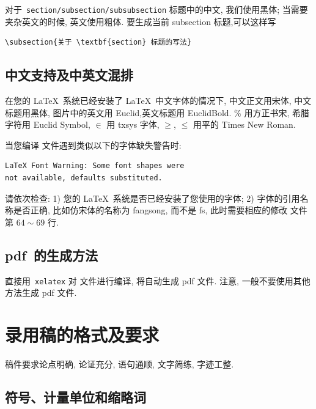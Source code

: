\documentclass{aas}
\begin{document}
对于~\verb|section/subsection/subsubsection| 标题中的中文, 我们使用黑体; 当需要夹杂英文的时候, 英文使用粗体. 要生成当前 subsection 标题,可以这样写
\begin{verbatim}
\subsection{关于 \textbf{section} 标题的写法}
\end{verbatim}

\subsection{中文支持及中英文混排}

在您的 \LaTeX\ 系统已经安装了 \LaTeX\ 中文字体的情况下, 中文正文用宋体, 中文标题用黑体,
图片中的英文用 Euclid,英文标题用 EuclidBold. \% 用方正书宋, 希腊字符用 Euclid Symbol,
$\in$ 用 txsys 字体, $\ge$, $\le$ 用平的 Times New Roman.


当您编译  文件遇到类似以下的字体缺失警告时:
\begin{verbatim}
LaTeX Font Warning: Some font shapes were
not available, defaults substituted.
\end{verbatim}

请依次检查: 1) 您的 \LaTeX\ 系统是否已经安装了您使用的字体; 2) 字体的引用名称是否正确, 比如仿宋体的名称为 fangsong, 而不是 fs, 此时需要相应的修改  文件第 $64 \sim 69$ 行.

\subsection{\textbf{pdf}~的生成方法}

直接用~\verb|xelatex| 对  文件进行编译, 将自动生成 pdf 文件.
注意, 一般不要使用其他方法生成 pdf 文件.

\section{录用稿的格式及要求}

稿件要求论点明确, 论证充分, 语句通顺, 文字简练, 字迹工整.

\subsection{符号、计量单位和缩略词}
\end{document}

